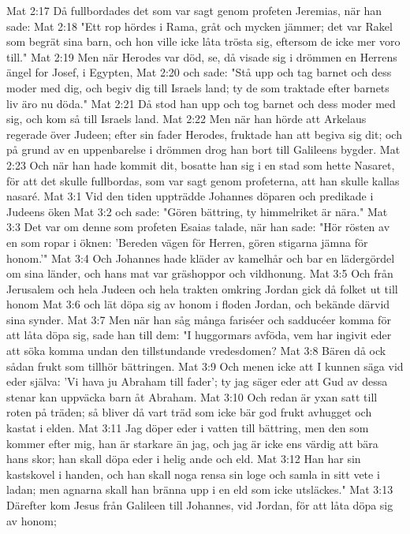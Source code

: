 Mat 2:17  Då fullbordades det som var sagt genom profeten Jeremias, när han sade:
Mat 2:18  "Ett rop hördes i Rama, gråt och mycken jämmer; det var Rakel som begrät sina barn, och hon ville icke låta trösta sig, eftersom de icke mer voro till."
Mat 2:19  Men när Herodes var död, se, då visade sig i drömmen en Herrens ängel for Josef, i Egypten,
Mat 2:20  och sade: "Stå upp och tag barnet och dess moder med dig, och begiv dig till Israels land; ty de som traktade efter barnets liv äro nu döda."
Mat 2:21  Då stod han upp och tog barnet och dess moder med sig, och kom så till Israels land.
Mat 2:22  Men när han hörde att Arkelaus regerade över Judeen; efter sin fader Herodes, fruktade han att begiva sig dit; och på grund av en uppenbarelse i drömmen drog han bort till Galileens bygder.
Mat 2:23  Och när han hade kommit dit, bosatte han sig i en stad som hette Nasaret, för att det skulle fullbordas, som var sagt genom profeterna, att han skulle kallas nasaré.
Mat 3:1  Vid den tiden uppträdde Johannes döparen och predikade i Judeens öken
Mat 3:2  och sade: "Gören bättring, ty himmelriket är nära."
Mat 3:3  Det var om denne som profeten Esaias talade, när han sade: "Hör rösten av en som ropar i öknen: 'Bereden vägen för Herren, gören stigarna jämna för honom.'"
Mat 3:4  Och Johannes hade kläder av kamelhår och bar en lädergördel om sina länder, och hans mat var gräshoppor och vildhonung.
Mat 3:5  Och från Jerusalem och hela Judeen och hela trakten omkring Jordan gick då folket ut till honom
Mat 3:6  och lät döpa sig av honom i floden Jordan, och bekände därvid sina synder.
Mat 3:7  Men när han såg många fariséer och sadducéer komma för att låta döpa sig, sade han till dem: "I huggormars avföda, vem har ingivit eder att söka komma undan den tillstundande vredesdomen?
Mat 3:8  Bären då ock sådan frukt som tillhör bättringen.
Mat 3:9  Och menen icke att I kunnen säga vid eder själva: 'Vi hava ju Abraham till fader'; ty jag säger eder att Gud av dessa stenar kan uppväcka barn åt Abraham.
Mat 3:10  Och redan är yxan satt till roten på träden; så bliver då vart träd som icke bär god frukt avhugget och kastat i elden.
Mat 3:11  Jag döper eder i vatten till bättring, men den som kommer efter mig, han är starkare än jag, och jag är icke ens värdig att bära hans skor; han skall döpa eder i helig ande och eld.
Mat 3:12  Han har sin kastskovel i handen, och han skall noga rensa sin loge och samla in sitt vete i ladan; men agnarna skall han bränna upp i en eld som icke utsläckes."
Mat 3:13  Därefter kom Jesus från Galileen till Johannes, vid Jordan, för att låta döpa sig av honom;
